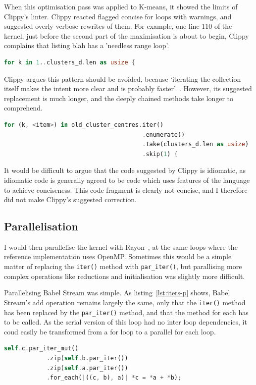 When this optimisation pass was applied to K-means, it showed the limits of Clippy's linter. Clippy reacted flagged concise for loops with warnings, and suggested overly verbose rewrites of them. For example, one line 110 of the kernel, just before the second part of the maximisation is about to begin, Clippy complains that listing blah has a 'needless range loop'.
\begin{lstlisting}[language=Rust]
for k in 1..clusters_d.len as usize {
\end{lstlisting}
Clippy argues this pattern should be avoided, because `iterating the collection itself makes the intent more clear and is probably faster'~\cite{ClippyLoop}. However, its suggested replacement is much longer, and the deeply chained methods take longer to comprehend.
\begin{lstlisting}[language=Rust]
 for (k, <item>) in old_cluster_centres.iter()
                                       .enumerate()
                                       .take(clusters_d.len as usize)
                                       .skip(1) {
\end{lstlisting}
It would be difficult to argue that the code suggested by Clippy is idiomatic, as idiomatic code is generally agreed to be code which uses features of the language to achieve conciseness. This code fragment is clearly not concise, and I therefore did not make Clippy's suggested correction.
\subsection{Parallelisation}
I would then parallelise the kernel with Rayon~\cite{RustRayon}, at the same loops where the reference implementation uses OpenMP. Sometimes this would be a simple matter of replacing the \texttt{iter()} method with \texttt{par\_iter()}, but parallising more complex operations like reductions and initialisation was slightly more difficult.

Parallelising Babel Stream was simple. As listing~\ref{lst:iters-p} shows, Babel Stream's add operation remains largely the same, only that the \texttt{iter()} method has been replaced by the \texttt{par\_iter()} method, and that the method for each has to be called. As the serial version of this loop had no inter loop dependencies, it coud easily be transformed from a for loop to a parallel for each loop.
\begin{lstlisting}[language=Rust, label=lst:iters-p, caption={Babel Stream Add, parallelises}]
self.c.par_iter_mut()
            .zip(self.b.par_iter())
            .zip(self.a.par_iter())
            .for_each(|((c, b), a)| *c = *a + *b);
\end{lstlisting}

